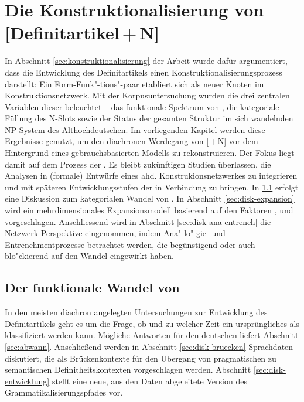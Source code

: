 \chapter{Die Konstruktionalisierung von [Definitartikel\,+\,N]} \label{bicpic}

In Abschnitt \ref{sec:konstruktionalisierung} der Arbeit wurde dafür argumentiert, dass die Entwicklung des Definitartikels  einen Konstruktionalisierungsprozess  darstellt: Ein Form-Funk"-tions"-paar etabliert sich als neuer Knoten im  Konstruktionsnetzwerk. Mit der  Korpusuntersuchung  wurden die drei zentralen Variablen dieser  beleuchtet -- das funktionale Spektrum von , die kategoriale Füllung des N-Slots sowie der Status der gesamten Struktur im sich wandelnden  NP-System  des Althochdeutschen. Im vorliegenden Kapitel werden diese Ergebnisse genutzt, um den diachronen Werdegang von [\,+\,N] vor dem Hintergrund eines gebrauchsbasierten Modells zu rekonstruieren. 
Der Fokus liegt damit auf dem Prozess der . Es bleibt zukünftigen Studien überlassen, die Analysen in (formale) Entwürfe eines ahd. Konstrukionsnetzwerkes  zu integrieren und  mit späteren Entwicklungsstufen der  in Verbindung zu bringen. 
In \ref{diskussion:der} erfolgt eine Diskussion zum kategorialen Wandel von .  In Abschnitt \ref{sec:disk-expansion} wird ein mehrdimensionales Expansionsmodell  basierend auf den Faktoren ,   und  vorgeschlagen. Anschlies\-send wird in Abschnitt \ref{sec:disk-ana-entrench} die Netzwerk-Perspektive eingenommen, indem Ana"-lo"-gie- und  Entrenchmentprozesse  betrachtet werden, die begünstigend oder auch blo"ckierend auf den Wandel eingewirkt haben. 

\section{Der funktionale Wandel von } \label{diskussion:der}

In den meisten diachron angelegten Untersuchungen zur Entwicklung des Definitartikels  geht es um die Frage, ob und zu welcher Zeit ein ursprüngliches  als  klassifiziert werden kann. Mögliche Antworten für den deutschen  liefert Abschnitt \ref{sec:abwann}. Anschließend werden in Abschnitt \ref{sec:disk-bruecken} Sprachdaten diskutiert, die  als Brückenkontexte  für den Übergang von pragmatischen  zu semantischen  Definitheitskontexten  vorgeschlagen werden. Abschnitt \ref{sec:disk-entwicklung} stellt eine neue, aus den Daten abgeleitete Version des Grammatikalisierungspfades  vor. 

